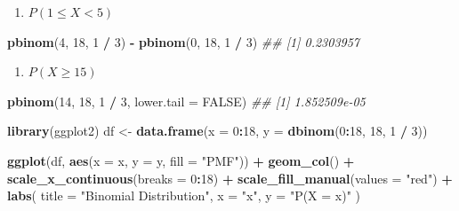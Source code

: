 \documentclass[
]{article}
\newenvironment{Shaded}{\begin{snugshade}}{\end{snugshade}}
\newcommand{\CommentTok}[1]{\textcolor[rgb]{0.56,0.35,0.01}{\textit{#1}}}
\newcommand{\DataTypeTok}[1]{\textcolor[rgb]{0.13,0.29,0.53}{#1}}
\newcommand{\DecValTok}[1]{\textcolor[rgb]{0.00,0.00,0.81}{#1}}
\newcommand{\KeywordTok}[1]{\textcolor[rgb]{0.13,0.29,0.53}{\textbf{#1}}}
\newcommand{\NormalTok}[1]{#1}
\newcommand{\OperatorTok}[1]{\textcolor[rgb]{0.81,0.36,0.00}{\textbf{#1}}}
\newcommand{\OtherTok}[1]{\textcolor[rgb]{0.56,0.35,0.01}{#1}}
\newcommand{\StringTok}[1]{\textcolor[rgb]{0.31,0.60,0.02}{#1}}
\providecommand{\tightlist}{%
  \setlength{\itemsep}{0pt}\setlength{\parskip}{0pt}}
\begin{document}
\begin{enumerate}
\def\labelenumi{\arabic{enumi}.}
\setcounter{enumi}{2}
\tightlist
\item
  \(P(1 \le X < 5)\)
\end{enumerate}

\begin{Shaded}
\begin{Highlighting}[]
\KeywordTok{pbinom}\NormalTok{(}\DecValTok{4}\NormalTok{, }\DecValTok{18}\NormalTok{, }\DecValTok{1} \OperatorTok{/}\StringTok{ }\DecValTok{3}\NormalTok{) }\OperatorTok{{-}}\StringTok{ }\KeywordTok{pbinom}\NormalTok{(}\DecValTok{0}\NormalTok{, }\DecValTok{18}\NormalTok{, }\DecValTok{1} \OperatorTok{/}\StringTok{ }\DecValTok{3}\NormalTok{)}
\CommentTok{\#\# [1] 0.2303957}
\end{Highlighting}
\end{Shaded}

\begin{enumerate}
\def\labelenumi{\arabic{enumi}.}
\setcounter{enumi}{3}
\tightlist
\item
  \(P(X \ge 15)\)
\end{enumerate}

\begin{Shaded}
\begin{Highlighting}[]
\KeywordTok{pbinom}\NormalTok{(}\DecValTok{14}\NormalTok{, }\DecValTok{18}\NormalTok{, }\DecValTok{1} \OperatorTok{/}\StringTok{ }\DecValTok{3}\NormalTok{, }\DataTypeTok{lower.tail =} \OtherTok{FALSE}\NormalTok{)}
\CommentTok{\#\# [1] 1.852509e{-}05}
\end{Highlighting}
\end{Shaded}

\begin{Shaded}
\begin{Highlighting}[]
\KeywordTok{library}\NormalTok{(ggplot2)}
\NormalTok{df \textless{}{-}}\StringTok{ }\KeywordTok{data.frame}\NormalTok{(}\DataTypeTok{x =} \DecValTok{0}\OperatorTok{:}\DecValTok{18}\NormalTok{, }\DataTypeTok{y =} \KeywordTok{dbinom}\NormalTok{(}\DecValTok{0}\OperatorTok{:}\DecValTok{18}\NormalTok{, }\DecValTok{18}\NormalTok{, }\DecValTok{1} \OperatorTok{/}\StringTok{ }\DecValTok{3}\NormalTok{))}

\KeywordTok{ggplot}\NormalTok{(df, }\KeywordTok{aes}\NormalTok{(}\DataTypeTok{x =}\NormalTok{ x, }\DataTypeTok{y =}\NormalTok{ y, }\DataTypeTok{fill =} \StringTok{"PMF"}\NormalTok{)) }\OperatorTok{+}
\StringTok{  }\KeywordTok{geom\_col}\NormalTok{() }\OperatorTok{+}
\StringTok{  }\KeywordTok{scale\_x\_continuous}\NormalTok{(}\DataTypeTok{breaks =} \DecValTok{0}\OperatorTok{:}\DecValTok{18}\NormalTok{) }\OperatorTok{+}
\StringTok{  }\KeywordTok{scale\_fill\_manual}\NormalTok{(}\DataTypeTok{values =} \StringTok{"red"}\NormalTok{) }\OperatorTok{+}
\StringTok{  }\KeywordTok{labs}\NormalTok{(}
    \DataTypeTok{title =} \StringTok{"Binomial Distribution"}\NormalTok{,}
    \DataTypeTok{x =} \StringTok{"x"}\NormalTok{,}
    \DataTypeTok{y =} \StringTok{"P(X = x)"}
\NormalTok{  )}
\end{Highlighting}
\end{Shaded}
\end{document}
